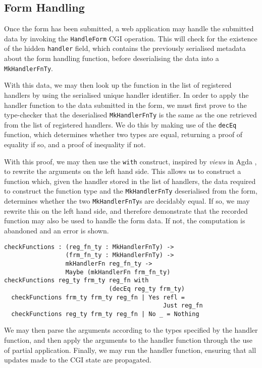 \documentclass[preprint]{sigplanconf}
\begin{document}
\subsection{Form Handling}
\label{formhandling}
Once the form has been submitted, a web application may handle the submitted data by invoking the \texttt{HandleForm} CGI operation. This will check for the existence of the hidden \texttt{handler} field, which contains the previously serialised metadata about the form handling function, before deserialising the data into a \texttt{MkHandlerFnTy}. 

With this data, we may then look up the function in the list of registered handlers by using the serialised unique handler identifier. In order to apply the handler function to the data submitted in the form, we must first prove to the type-checker that the deserialised \texttt{MkHandlerFnTy} is the same as the one retrieved from the list of registered handlers. We do this by making use of the \texttt{decEq} function, which determines whether two types are equal, returning a proof of equality if so, and a proof of inequality if not.

With this proof, we may then use the \texttt{with} construct, inspired by \textit{views} in Agda \cite{mcbride.mckinna:viewfromleft}, to rewrite the arguments on the left hand side. This allows us to construct a function which, given the handler stored in the list of handlers, the data required to construct the function type and the \texttt{MkHandlerFnTy} deserialised from the form, determines whether the two \texttt{MkHandlerFnTy}s are decidably equal. If so, we may rewrite this on the left hand side, and therefore demonstrate that the recorded function may also be used to handle the form data. If not, the computation is abandoned and an error is shown. %
\begin{Verbatim}
checkFunctions : (reg_fn_ty : MkHandlerFnTy) -> 
                 (frm_fn_ty : MkHandlerFnTy) -> 
                 mkHandlerFn reg_fn_ty -> 
                 Maybe (mkHandlerFn frm_fn_ty)
checkFunctions reg_ty frm_ty reg_fn with 
                             (decEq reg_ty frm_ty)
  checkFunctions frm_ty frm_ty reg_fn | Yes refl = 
                                            Just reg_fn
  checkFunctions reg_ty frm_ty reg_fn | No _ = Nothing
\end{Verbatim}
We may then parse the arguments according to the types specified by the handler function, and then apply the arguments to the handler function through the use of partial application. Finally, we may run the handler function, ensuring that all updates made to the CGI state are propagated.
\end{document}
